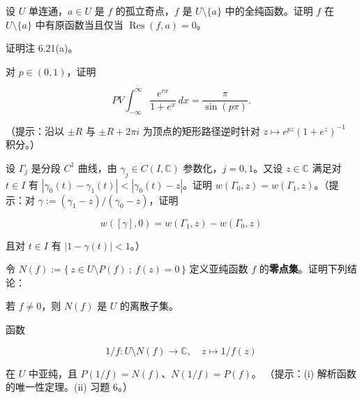 \begin{exercises}
\item

设 $ U $ 单连通，$ a \in U $ 是 $ f $ 的孤立奇点，$ f $ 是 $ U\setminus\{a\} $ 中的全纯函数。证明 $ f $ 在 $ U\setminus\{a\} $ 中有原函数当且仅当 $ \operatorname{Res}(f,a) = 0 $。

\item

证明注 6.21(a)。

\item

对 $ p \in (0, 1) $，证明

\[
PV\int_{-\infty}^{\infty}\frac{e^{rx}}{1 + e^{x}}\,dx = \frac{\pi}{\sin(p\pi)} .
\]

（提示：沿以 $ \pm R $ 与 $ \pm R + 2\pi i $ 为顶点的矩形路径逆时针对 $ z \mapsto e^{pz}(1 + e^{z})^{-1} $ 积分。）

\item

设 $ \Gamma_{j} $ 是分段 $ C^{1} $ 曲线，由 $ \gamma_{j} \in C(I,\mathbb{C}) $ 参数化，$ j = 0, 1 $。又设 $ z \in \mathbb{C} $ 满足对 $ t \in I $ 有 $ \left|\gamma_{0}(t) - \gamma_{1}(t)\right| < \left|\gamma_{0}(t) - z\right| $。证明 $ w(\Gamma_{0},z) = w(\Gamma_{1},z) $。（提示：对 $ \gamma := (\gamma_{1} - z)/(\gamma_{0} - z) $，证明

\[
w([\gamma],0) = w(\Gamma_{1},z) - w(\Gamma_{0},z)
\]

且对 $ t \in I $ 有 $ \left|1 - \gamma(t)\right| < 1 $。）

\item

令 $ N(f) := \{\, z \in U\setminus P(f) \ ;\ f(z) = 0 \,\} $ 定义亚纯函数 $ f $ 的\textbf{零点集}。证明下列结论：

\begin{subitems}
\item

若 $ f \ne 0 $，则 $ N(f) $ 是 $ U $ 的离散子集。

\item

函数

\[
1/f : U\setminus N(f) \to \mathbb{C} , \quad z \mapsto 1/f(z)
\]

在 $ U $ 中亚纯，且 $ P(1/f) = N(f) $、$ N(1/f) = P(f) $。
（提示：(i) 解析函数的唯一性定理。(ii) 习题 6。）

\end{subitems}

\item


\end{exercises}
